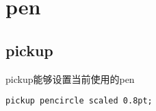 \section{pen}
\subsection{pickup}
pickup能够设置当前使用的pen
\begin{lstlisting}[language=Tex]
pickup pencircle scaled 0.8pt;
\end{lstlisting}
